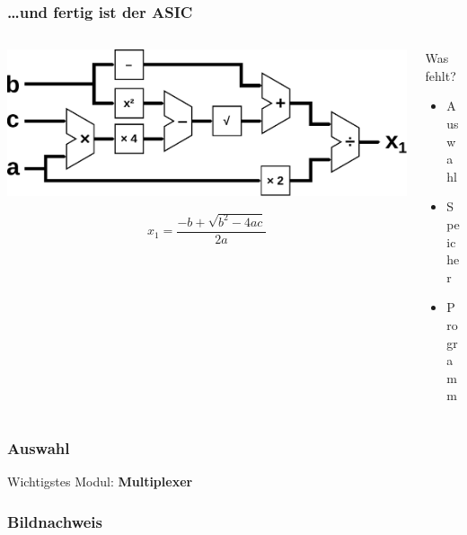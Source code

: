 \documentclass[c,aspectratio=169]{beamer}
\begin{document}
\begin{frame}
  \frametitle{\ldots und fertig ist der ASIC}

  \begin{columns}
    \begin{column}{.45\textwidth}
      \begin{center}
        \includegraphics[width=\linewidth]{abc-formel.pdf}

        \[ x_1 = \frac{-b + \sqrt{b^2 - 4ac}}{2a} \]
      \end{center}
    \end{column}
    \begin{column}{.45\textwidth}
      Was fehlt?
      \begin{itemize}
      \item Auswahl
      \item Speicher
      \item Programm
      \end{itemize}
    \end{column}
  \end{columns}
\end{frame}

\begin{frame}
  \frametitle{Auswahl}

  Wichtigstes Modul: \textbf{Multiplexer}
\end{frame}








\begin{frame}
  \frametitle{Bildnachweis}
  \tiny
  \begin{description}
  \end{description}
\end{frame}
\end{document}
